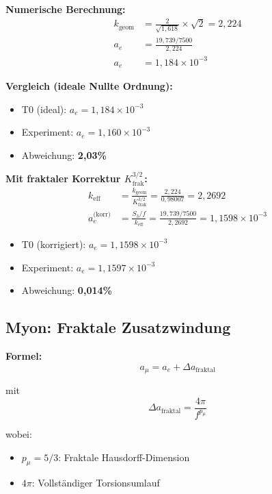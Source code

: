	\textbf{Numerische Berechnung:}
	\begin{align}
		k_{\text{geom}} &= \frac{2}{\sqrt{1{,}618}} \times \sqrt{2} = 2{,}224 \\
		a_e &= \frac{19{,}739 / 7500}{2{,}224} \\
		a_e &= 1{,}184 \times 10^{-3}
	\end{align}
	
	\textbf{Vergleich (ideale Nullte Ordnung):}
	\begin{itemize}
		\item T0 (ideal): $a_e = 1{,}184 \times 10^{-3}$
		\item Experiment: $a_e = 1{,}160 \times 10^{-3}$
		\item Abweichung: \textbf{2{,}03\%}
	\end{itemize}
	
	\textbf{Mit fraktaler Korrektur $K_\text{frak}^{3/2}$:}
	\begin{align}
		k_\text{eff} &= \frac{k_\text{geom}}{K_\text{frak}^{3/2}} = \frac{2{,}224}{0{,}98007} = 2{,}2692 \\
		a_e^\text{(korr)} &= \frac{S_3/f}{k_\text{eff}} = \frac{19{,}739/7500}{2{,}2692} = 1{,}1598 \times 10^{-3}
	\end{align}
	\begin{itemize}
		\item T0 (korrigiert): $a_e = 1{,}1598 \times 10^{-3}$
		\item Experiment: $a_e = 1{,}1597 \times 10^{-3}$
		\item Abweichung: \textbf{0{,}014\%}
	\end{itemize}
	
	\subsection{Myon: Fraktale Zusatzwindung}
	
	\textbf{Formel:}
	\begin{equation}
		a_\mu = a_e + \Delta a_{\text{fraktal}}
		\label{eq:amu}
	\end{equation}
	
	mit
	\begin{equation}
		\Delta a_{\text{fraktal}} = \frac{4\pi}{f^{p_\mu}}
		\label{eq:delta_mu}
	\end{equation}
	
	wobei:
	\begin{itemize}
		\item $p_\mu = 5/3$: Fraktale Hausdorff-Dimension
		\item $4\pi$: Vollständiger Torsionsumlauf
	\end{itemize}
	
